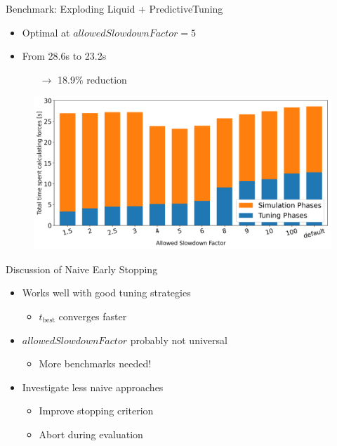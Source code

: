 \documentclass[
	10pt,
	t		%
]{beamer}
\begin{document}
\begin{frame}{Benchmark: Exploding Liquid + PredictiveTuning}

    \begin{itemize}
        \item Optimal at $allowedSlowdownFactor = 5$
        \item From 28.6s to 23.2s
              \begin{itemize}
                  \item[$\rightarrow$] 18.9\% reduction
              \end{itemize}
    \end{itemize}


    \begin{figure}[H]
        \centering

        \includegraphics[width=0.92\columnwidth]{../../data/explodingLiquid/cluster/predictiveTuning/analytics/total_time_average_full_scale.png}


    \end{figure}

\end{frame}


\begin{frame}{Discussion of Naive Early Stopping}

    \begin{itemize}
        \item Works well with good tuning strategies
              \begin{itemize}
                  \item $t_{\text{best}}$ converges faster
              \end{itemize}
        \item $allowedSlowdownFactor$ probably not universal
              \begin{itemize}
                  \item More benchmarks needed!
              \end{itemize}
        \item Investigate less naive approaches
              \begin{itemize}
                  \item Improve stopping criterion
                  \item Abort during evaluation
              \end{itemize}
    \end{itemize}
\end{frame}
\end{document}
